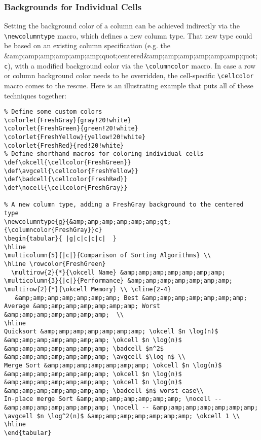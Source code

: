 \subsubsection{Backgrounds for Individual Cells}

Setting the background color of a column can be achieved indirectly via the \verb|\newcolumntype| macro, which defines a new column type. That new type could be based on an existing column specification (e.g. the &amp;amp;amp;amp;amp;amp;quot;centered&amp;amp;amp;amp;amp;amp;quot; \verb|c|), with a modified background color via the \verb|\columncolor| macro. In case a row or column background color needs to be overridden, the cell-specific \verb|\cellcolor| macro comes to the rescue. Here is an illustrating example that puts all of these techniques together:

\begin{lstlisting}
% Define some custom colors
\colorlet{FreshGray}{gray!20!white}
\colorlet{FreshGreen}{green!20!white}
\colorlet{FreshYellow}{yellow!20!white}
\colorlet{FreshRed}{red!20!white}
% Define shorthand macros for coloring individual cells
\def\okcell{\cellcolor{FreshGreen}}
\def\avgcell{\cellcolor{FreshYellow}}
\def\badcell{\cellcolor{FreshRed}}
\def\nocell{\cellcolor{FreshGray}}

% A new column type, adding a FreshGray background to the centered type
\newcolumntype{g}{&amp;amp;amp;amp;amp;amp;gt;{\columncolor{FreshGray}}c}
\begin{tabular}{ |g|c|c|c|c|  }
\hline
\multicolumn{5}{|c|}{Comparison of Sorting Algorithms} \\
\hline \rowcolor{FreshGreen} 
  \multirow{2}{*}{\okcell Name} &amp;amp;amp;amp;amp;amp;amp; \multicolumn{3}{|c|}{Performance} &amp;amp;amp;amp;amp;amp;amp; \multirow{2}{*}{\okcell Memory} \\ \cline{2-4}
   &amp;amp;amp;amp;amp;amp;amp; Best &amp;amp;amp;amp;amp;amp;amp; Average &amp;amp;amp;amp;amp;amp;amp; Worst &amp;amp;amp;amp;amp;amp;amp;  \\
\hline
Quicksort &amp;amp;amp;amp;amp;amp;amp; \okcell $n \log(n)$ &amp;amp;amp;amp;amp;amp;amp; \okcell $n \log(n)$ &amp;amp;amp;amp;amp;amp;amp; \badcell $n^2$ &amp;amp;amp;amp;amp;amp;amp; \avgcell $\log n$ \\
Merge Sort &amp;amp;amp;amp;amp;amp;amp; \okcell $n \log(n)$ &amp;amp;amp;amp;amp;amp;amp; \okcell $n \log(n)$ &amp;amp;amp;amp;amp;amp;amp; \okcell $n \log(n)$ &amp;amp;amp;amp;amp;amp;amp; \badcell $n$ worst case\\
In-place merge Sort &amp;amp;amp;amp;amp;amp;amp; \nocell -- &amp;amp;amp;amp;amp;amp;amp; \nocell -- &amp;amp;amp;amp;amp;amp;amp; \avgcell $n \log^2(n)$ &amp;amp;amp;amp;amp;amp;amp; \okcell 1 \\
\hline
\end{tabular}
\end{lstlisting}


